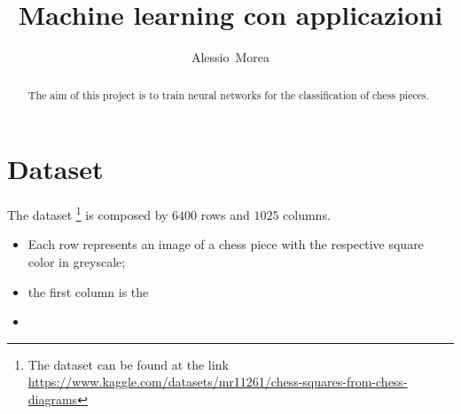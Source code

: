 \documentclass[12pt,english, openany]{article}		%
\begin{document}
\title{Machine learning con applicazioni}
\author{Alessio~Morea}

\maketitle



\begin{abstract}
The aim of this project is to train neural networks for the classification of chess pieces.
\end{abstract}
\section{Dataset}
The dataset \footnote{The dataset can be found at the link \href{https://www.kaggle.com/datasets/mr11261/chess-squares-from-chess-diagrams}{https://www.kaggle.com/datasets/mr11261/chess-squares-from-chess-diagrams}}
 is composed by $6400$ rows and $1025$ columns.
\begin{itemize}
\item Each row represents an image of a chess piece with the respective square color in greyscale;
\item the first column is the 
\item 
\end{itemize}

\cite{10.5555/2188385.2188395}





\end{document}
